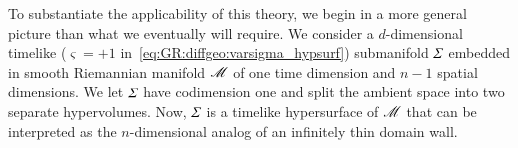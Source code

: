 To substantiate the applicability of this theory, we begin in a more general picture than what we eventually will require. We consider a $d$-dimensional timelike ($\varsigma = +1$ in~\cref{eq:GR:diffgeo:varsigma_hypsurf}) submanifold $\varSigma$ embedded in smooth Riemannian manifold $\mathscr{M}$ of one time dimension and $n-1$ spatial dimensions. 
We let $\varSigma$ have codimension one and split the ambient space into two separate hypervolumes. Now, $\varSigma$ is a timelike hypersurface of $\mathscr{M}$ that can be interpreted as the $n$-dimensional analog of an infinitely thin domain wall.%


















